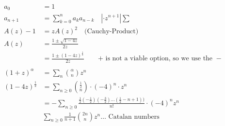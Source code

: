 \begin{align*}
    a_0 &= 1 \\
    a_{n+1} &= \sum_{k=0}^{n} a_k a_{n-k}
        \quad | \cdot z^{n+1} | \sum \\
    A(z) - 1 &= z A(z)^2
        \quad \text{(Cauchy-Product)} \\
    A(z) &= \frac{1 \pm \sqrt{1-4z}}{2z}\\
        &= \frac{1 \pm (1-4z)^\frac1{2}}{2z} \qquad
    \text{$+$ is not a viable option, so we use the $-$} \\
     \\
    (1 + z)^\alpha &= \sum_n {\binom{\alpha}{ n}} z^n \\
    (1-4z)^\frac1{2} &= \sum_{n \geq 0} \binom{\frac12}{n} \cdot (-4)^n \cdot z^n\\
	&= - \sum_{n\geq 0} \frac{\frac12 (-\frac12) (-\frac32) \ldots (\frac12 - n+1))}{n!} \cdot (-4)^n z^n \\
    &\sum_{n\geq 0} \frac{1}{n+1} {\binom{2n}{n}} z^n \dotsc
    \text{ Catalan numbers}
\end{align*}












